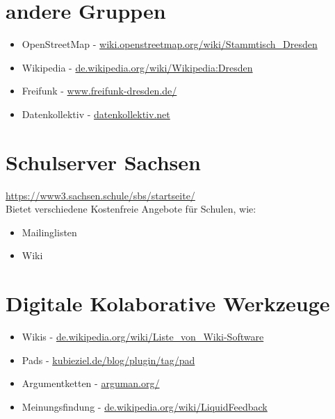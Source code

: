 \documentclass[11pt,a4paper]{article}
\begin{document}
\section{andere Gruppen}
\begin{itemize}
	\item OpenStreetMap - \href{https://wiki.openstreetmap.org/wiki/Stammtisch_Dresden}{wiki.openstreetmap.org/wiki/Stammtisch\_Dresden}
	\item Wikipedia - \href{https://de.wikipedia.org/wiki/Wikipedia:Dresden}{de.wikipedia.org/wiki/Wikipedia:Dresden}
	\item Freifunk - \href{https://www.freifunk-dresden.de/}{www.freifunk-dresden.de/}
	\item Datenkollektiv - \href{https://datenkollektiv.net}{datenkollektiv.net}
\end{itemize}

\section{Schulserver Sachsen}
\url{https://www3.sachsen.schule/sbs/startseite/} \\
Bietet verschiedene Kostenfreie Angebote für Schulen, wie: 
\begin{itemize}
	\item Mailinglisten
	\item Wiki 
\end{itemize}

\section{Digitale Kolaborative Werkzeuge }
\begin{itemize}
	\item Wikis - \href{https://de.wikipedia.org/wiki/Liste_von_Wiki-Software}{de.wikipedia.org/wiki/Liste\_von\_Wiki-Software}
	\item Pads - \href{https://kubieziel.de/blog/plugin/tag/pad}{kubieziel.de/blog/plugin/tag/pad}
	\item Argumentketten - \href{http://en.arguman.org/}{arguman.org/}
	\item Meinungsfindung - \href{https://de.wikipedia.org/wiki/LiquidFeedback}{de.wikipedia.org/wiki/LiquidFeedback}
\end{itemize}
\end{document}
